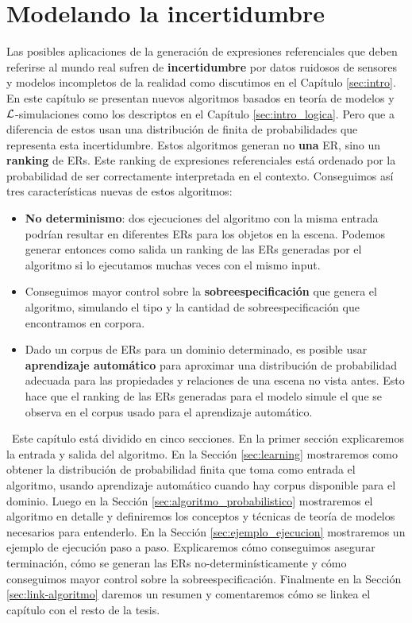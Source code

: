 \chapter{Modelando la incertidumbre}
\label{sec:algoritmo}
 Las posibles aplicaciones de la generaci\'on de expresiones referenciales que deben referirse al mundo real sufren de \textbf{incertidumbre} por datos ruidosos de sensores y modelos incompletos de la realidad como discutimos en el Cap\'itulo \ref{sec:intro}.
En este cap\'itulo se presentan nuevos algoritmos basados en teor\'ia de modelos y $\mathcal{L}$-simulaciones como los descriptos en el Cap\'itulo \ref{sec:intro_logica}. Pero que a diferencia de estos usan una distribuci\'on de finita de probabilidades que representa esta incertidumbre. Estos algoritmos generan no \textbf{una} ER, sino un \textbf{ranking} de ERs. Este ranking de expresiones referenciales est\'a ordenado por la probabilidad de ser correctamente interpretada en el contexto. 
Conseguimos as\'i tres caracter\'isticas nuevas de estos algoritmos:
\begin{itemize}
 \item \textbf{No determinismo}: dos ejecuciones del algoritmo con la
misma entrada podr\'{i}an resultar en diferentes ERs para los objetos en la escena. Podemos generar entonces como salida un ranking de las ERs generadas por el algoritmo si lo ejecutamos muchas veces con
el mismo input. 
 \item Conseguimos mayor control sobre la \textbf{sobreespecificaci\'on} que genera el algoritmo, simulando el tipo y la cantidad de sobreespecificaci\'on que encontramos en  corpora.
 \item Dado un corpus de ERs para un dominio determinado,
es posible usar \textbf{aprendizaje autom\'atico} para aproximar una distribuci\'on de probabilidad adecuada para las propiedades y relaciones de una escena no vista antes. Esto hace que el ranking de las ERs generadas para el modelo simule el que se observa en el corpus usado para el aprendizaje autom\'atico.
\end{itemize}
\
Este cap\'itulo est\'a dividido en cinco secciones. En la primer secci\'on explicaremos la entrada y salida del algoritmo. En la Secci\'on \ref{sec:learning} mostraremos como obtener la distribuci\'on de probabilidad finita que toma como entrada el algoritmo, usando aprendizaje autom\'atico cuando hay corpus disponible para el dominio. Luego en la Secci\'on \ref{sec:algoritmo_probabilistico} mostraremos el algoritmo en detalle y definiremos los conceptos y t\'ecnicas de teor\'ia de modelos necesarios para entenderlo. En la Secci\'on \ref{sec:ejemplo_ejecucion} mostraremos un ejemplo de ejecuci\'on paso a paso. Explicaremos c\'omo conseguimos asegurar terminaci\'on, c\'omo se generan las ERs no-determin\'isticamente y c\'omo conseguimos mayor control sobre la sobreespecificaci\'on. Finalmente en la Secci\'on \ref{sec:link-algoritmo} daremos un resumen y comentaremos c\'omo se linkea el cap\'itulo con el resto de la tesis.

